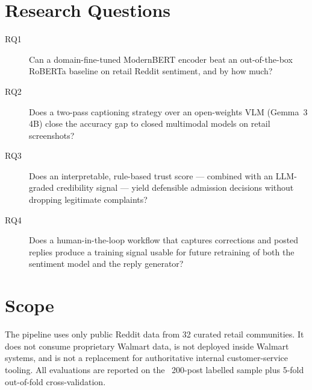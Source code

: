 \section{Research Questions}
\begin{description}
\item[RQ1] Can a domain-fine-tuned ModernBERT encoder beat an out-of-the-box
      RoBERTa baseline on retail Reddit sentiment, and by how much?
\item[RQ2] Does a two-pass captioning strategy over an open-weights VLM
      (Gemma~3 4B) close the accuracy gap to closed multimodal models on
      retail screenshots?
\item[RQ3] Does an interpretable, rule-based trust score --- combined with an
      LLM-graded credibility signal --- yield defensible admission decisions
      without dropping legitimate complaints?
\item[RQ4] Does a human-in-the-loop workflow that captures corrections and
      posted replies produce a training signal usable for future retraining
      of both the sentiment model and the reply generator?
\end{description}

\section{Scope}
The pipeline uses only public Reddit data from 32 curated retail communities.
It does not consume proprietary Walmart data, is not deployed inside Walmart
systems, and is not a replacement for authoritative internal customer-service
tooling.  All evaluations are reported on the ~200-post labelled sample plus
5-fold out-of-fold cross-validation.
